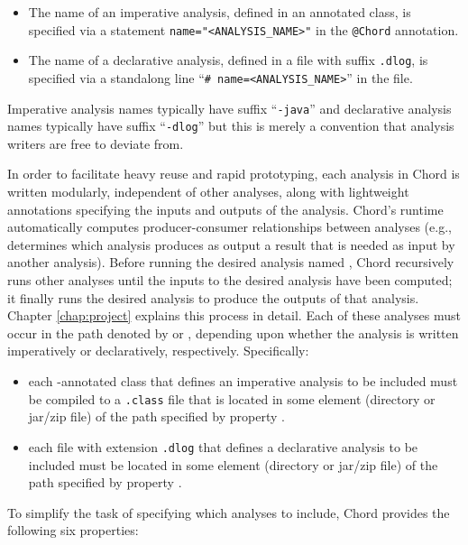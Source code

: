 \begin{itemize}
\item
The name of an imperative analysis, defined in an  annotated class, is
specified via a statement \verb+name="<ANALYSIS_NAME>"+ in the {\tt @Chord} annotation.
\item
The name of a declarative analysis, defined in a file with suffix {\tt .dlog}, is
specified via a standalong line ``\verb+# name=<ANALYSIS_NAME>+'' in the file.
\end{itemize}

Imperative analysis names typically have suffix ``{\tt -java}'' and
declarative analysis names typically have suffix ``{\tt -dlog}'' but
this is merely a convention that analysis writers are free to deviate from.

In order to facilitate heavy reuse and rapid prototyping, each analysis in Chord is written modularly, independent of other analyses,
along with lightweight annotations specifying the inputs and outputs of the
analysis.  Chord's runtime automatically computes producer-consumer
relationships between analyses (e.g., determines which analysis produces as
output a result that is needed as input by another analysis).  Before running
the desired analysis named , Chord recursively runs other
analyses until the inputs to the desired analysis have been computed; it finally
runs the desired analysis to produce the outputs of that analysis.
Chapter \ref{chap:project} explains this process in detail.
Each of these analyses must occur in the path denoted by  or
, depending upon whether the analysis is written 
imperatively or declaratively, respectively.
Specifically:

\begin{itemize}
\item
each -annotated class that defines an imperative analysis to be included
must be compiled to a {\tt .class} file that is located in some element (directory or jar/zip file)
of the path specified by property .
\item
each file with extension {\tt .dlog} that defines a declarative analysis to be included
must be located in some element (directory or jar/zip file) of the path specified by
property .
\end{itemize}

To simplify the task of specifying which analyses to include, Chord provides the
following six properties:

